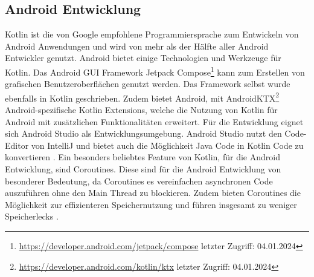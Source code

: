 \documentclass{article}
\begin{document}
\subsection{Android Entwicklung}
Kotlin ist die von Google empfohlene Programmiersprache zum Entwickeln von Android Anwendungen und wird von mehr als der Hälfte aller Android Entwickler genutzt. Android bietet einige Technologien und Werkzeuge für Kotlin. Das Android GUI Framework Jetpack Compose\footnote{\url{https://developer.android.com/jetpack/compose} letzter Zugriff: 04.01.2024} kann zum Erstellen von grafischen Benutzeroberflächen genutzt werden. Das Framework selbst wurde ebenfalls in Kotlin geschrieben. Zudem bietet Android, mit AndroidKTX\footnote{\url{https://developer.android.com/kotlin/ktx} letzter Zugriff: 04.01.2024} Android-spezifische Kotlin Extensions, welche die Nutzung von Kotlin für Android mit zusätzlichen Funktionalitäten erweitert. Für die Entwicklung eignet sich Android Studio als Entwicklungsumgebung. Android Studio nutzt den Code-Editor von IntelliJ und bietet auch die Möglichkeit Java Code in Kotlin Code zu konvertieren \cite{AndroidKotlin}. \newline
Ein besonders beliebtes Feature von Kotlin, für die Android Entwicklung, sind Coroutines. Diese sind für die Android Entwicklung von besonderer Bedeutung, da Coroutines es vereinfachen asynchronen Code auszuführen ohne den Main Thread zu blockieren. Zudem bieten Coroutines die Möglichkeit zur effizienteren Speichernutzung und führen insgesamt zu weniger Speicherlecks \cite{AndroidCoroutine}.
\end{document}

